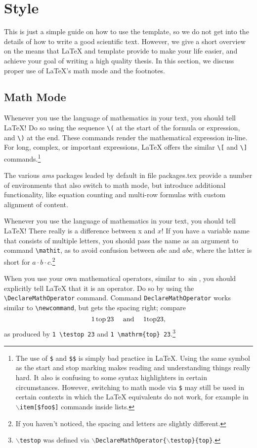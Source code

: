 \section{Style}
\label{sec:guide:style}
This is just a simple guide on how to use the \ac{template}, so we do not get
into the details of how to write a good scientific text.
However, we give a short overview on the means that \LaTeX{} and \ac{template}
provide to make your life easier, and achieve your goal of writing a high
quality thesis.
In this section, we discuss proper use of \LaTeX{}'s math mode and the
footnotes.



\subsection{Math Mode}
\label{sec:guide:style:math}
Whenever you use the language of mathematics in your text, you should tell
\LaTeX{}!
Do so using the sequence \verb+\(+ at the start of the formula or
expression, and \verb+\)+ at the end.
These commands render the mathematical expression in-line.
For long, complex, or important expressions, \LaTeX{} offers the similar
\verb+\[+ and \verb+\]+ commands.\footnote{The use of \texttt{\$} and
\texttt{\$\$} is simply bad practice in \LaTeX{}. Using the same symbol as the
start and stop marking makes reading and understanding things really hard.
It also is confusing to some syntax highlighters in certain circumstances.
However, switching to math mode via \texttt{\$} may still be used in certain
contexts in which the \LaTeX{} equivalents do not work, for example in
\mbox{\texttt{\(\backslash\)item[\$foo\$]}} commands inside lists.} 

The various \emph{ams} packages leaded by default in file \mbox{packages.tex} provide
a number of environments that also switch to math mode, but introduce
additional functionality, like equation counting and multi-row formulas with
custom alignment of content. 

Whenever you use the language of mathematics in your text, you should tell
\LaTeX{}!
There really is a difference between x and \(x\)!
If you have a variable name that consists of multiple letters, you should
pass the name as an argument to command \verb+\mathit+, as to avoid confusion
between \(\mathit{abc}\) and \(abc\), where the latter is short for \(a \cdot b
\cdot c\).\footnote{If you haven't noticed, the spacing and letters are
slightly different.}

When you use your own mathematical operators, similar to \(\sin\), you should
explicitly tell \LaTeX{} that it is an operator.
Do so by using the \verb+\DeclareMathOperator+ command.
Command \verb+DeclareMathOperator+ works similar to \verb+\newcommand+, but
gets the spacing right; compare 
\[1 \operatorname{top} 23 \quad \text{ and } \quad 1 \mathrm{top} 23,\] 
as produced by \verb+1 \testop 23+ and 
\verb+1 \mathrm{top} 23+.\footnote{\texttt{\(\backslash\)testop} was
defined via
\texttt{\(\backslash\)DeclareMathOperator\{\(\backslash\)testop\}\{top\}}.}



